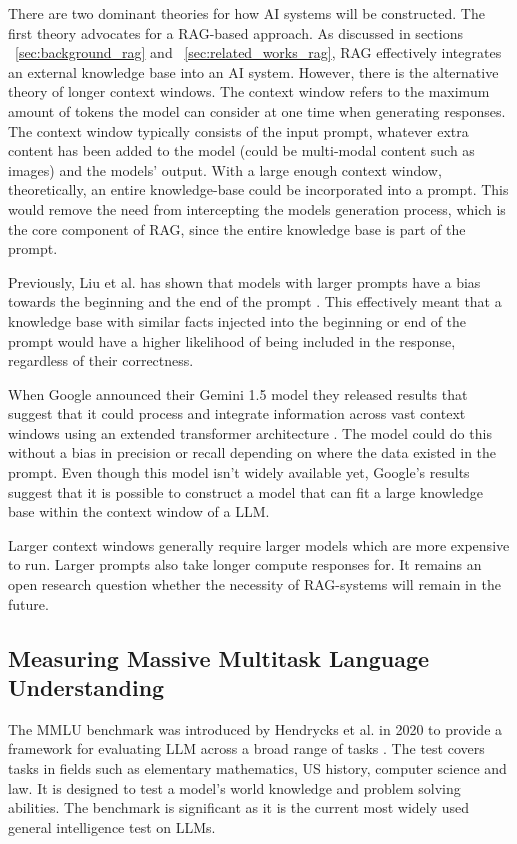 There are two dominant theories for how AI systems will be constructed. The first theory advocates for a \gls{RAG}-based approach. As discussed in sections ~\ref{sec:background_rag} and ~\ref{sec:related_works_rag}, \gls{RAG} effectively integrates an external knowledge base into an AI system. However, there is the alternative theory of longer context windows. The context window refers to the maximum amount of tokens the model can consider at one time when generating responses. The context window typically consists of the input prompt, whatever extra content has been added to the model (could be multi-modal content such as images) and the models’ output. With a large enough context window, theoretically, an entire knowledge-base could be incorporated into a prompt. This would remove the need from intercepting the models generation process, which is the core component of \gls{RAG}, since the entire knowledge base is part of the prompt.


Previously, Liu et al. has shown that models with larger prompts have a bias towards the beginning and the end of the prompt \cite{liu_lost_2023}. This effectively meant that a knowledge base with similar facts injected into the beginning or end of the prompt would have a higher likelihood of being included in the response, regardless of their correctness.


When Google announced their Gemini 1.5 model they released results that suggest that it could process and integrate information across vast context windows using an extended transformer architecture \cite{gemini_team_gemini_2024}. The model could do this without a bias in precision or recall depending on where the data existed in the prompt. Even though this model isn’t widely available yet, Google’s results suggest that it is possible to construct a model that can fit a large knowledge base within the context window of a \gls{LLM}.


Larger context windows generally require larger models which are more expensive to run. Larger prompts also take longer compute responses for. It remains an open research question whether the necessity of \gls{RAG}-systems will remain in the future.


\subsection{Measuring Massive Multitask Language Understanding}
The \gls{MMLU} benchmark was introduced by Hendrycks et al. in 2020 to provide a framework for evaluating \gls{LLM} across a broad range of tasks \cite{hendrycks_measuring_2021}. The test covers tasks in fields such as elementary mathematics, US history, computer science and law. It is designed to test a model's world knowledge and problem solving abilities. The benchmark is significant as it is the current most widely used general intelligence test on \gls{LLM}s.


